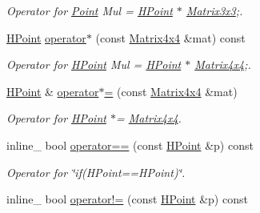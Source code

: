 \begin{DoxyCompactItemize}
\begin{DoxyCompactList}\small\item\em Operator for \hyperlink{class_point}{Point} Mul = \hyperlink{class_h_point}{H\+Point} $\ast$ \hyperlink{class_matrix3x3}{Matrix3x3};. \end{DoxyCompactList}\item 
\hypertarget{class_h_point_a58fccab708209221cd88ebd4f1c7e8c2}{\hyperlink{class_h_point}{H\+Point} \hyperlink{class_h_point_a58fccab708209221cd88ebd4f1c7e8c2}{operator$\ast$} (const \hyperlink{class_matrix4x4}{Matrix4x4} \&mat) const }\label{class_h_point_a58fccab708209221cd88ebd4f1c7e8c2}

\begin{DoxyCompactList}\small\item\em Operator for \hyperlink{class_h_point}{H\+Point} Mul = \hyperlink{class_h_point}{H\+Point} $\ast$ \hyperlink{class_matrix4x4}{Matrix4x4};. \end{DoxyCompactList}\item 
\hypertarget{class_h_point_a6fed42fdcf9b07c77786bbca4088a774}{\hyperlink{class_h_point}{H\+Point} \& \hyperlink{class_h_point_a6fed42fdcf9b07c77786bbca4088a774}{operator$\ast$=} (const \hyperlink{class_matrix4x4}{Matrix4x4} \&mat)}\label{class_h_point_a6fed42fdcf9b07c77786bbca4088a774}

\begin{DoxyCompactList}\small\item\em Operator for \hyperlink{class_h_point}{H\+Point} $\ast$= \hyperlink{class_matrix4x4}{Matrix4x4}. \end{DoxyCompactList}\item 
\hypertarget{class_h_point_a791b07e47cf68ce4d314cd40533183a0}{inline\+\_\+ bool \hyperlink{class_h_point_a791b07e47cf68ce4d314cd40533183a0}{operator==} (const \hyperlink{class_h_point}{H\+Point} \&p) const }\label{class_h_point_a791b07e47cf68ce4d314cd40533183a0}

\begin{DoxyCompactList}\small\item\em Operator for \char`\"{}if(\+H\+Point==\+H\+Point)\char`\"{}. \end{DoxyCompactList}\item 
\hypertarget{class_h_point_a9c320547a4b02d18144cea3d2703170b}{inline\+\_\+ bool \hyperlink{class_h_point_a9c320547a4b02d18144cea3d2703170b}{operator!=} (const \hyperlink{class_h_point}{H\+Point} \&p) const }\label{class_h_point_a9c320547a4b02d18144cea3d2703170b}


\end{DoxyCompactItemize}
